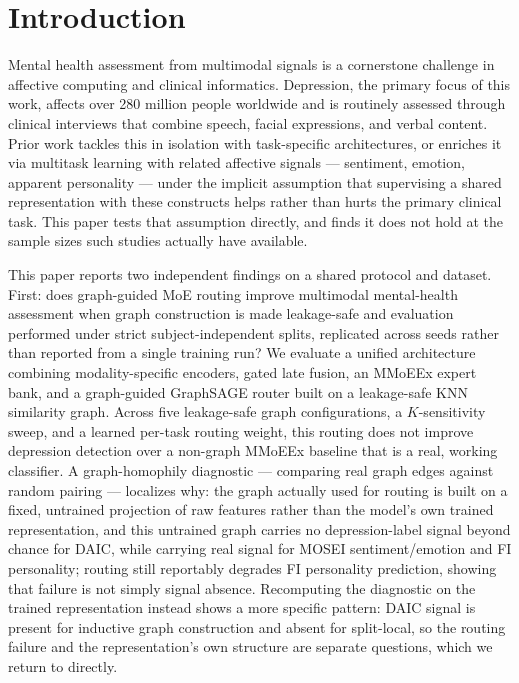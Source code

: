 \documentclass[twocolumn]{article}
\begin{document}
\begin{abstract}
is single-seed only, was never extended to this paper's 5-seed protocol, and is reported separately, under an explicit no-claims banner, precisely because a paper whose central finding is that single-seed results can mislead cannot also lean on six single-seed encoder comparisons as evidence. We release the leakage-safe graph construction protocol, the full multi-seed ablation ladder, and a claim-verification harness that binds every quantitative statement in this paper to a machine-checked artifact.
\end{abstract}

\section{Introduction}
\label{sec:introduction}

Mental health assessment from multimodal signals is a cornerstone challenge in affective computing and clinical informatics. Depression, the primary focus of this work, affects over 280 million people worldwide \citep{who2023depression} and is routinely assessed through clinical interviews that combine speech, facial expressions, and verbal content. Prior work tackles this in isolation with task-specific architectures, or enriches it via multitask learning with related affective signals — sentiment, emotion, apparent personality \citep{kendall2018multitask} — under the implicit assumption that supervising a shared representation with these constructs helps rather than hurts the primary clinical task. This paper tests that assumption directly, and finds it does not hold at the sample sizes such studies actually have available.

This paper reports two independent findings on a shared protocol and dataset. First: does graph-guided MoE routing improve multimodal mental-health assessment when graph construction is made leakage-safe and evaluation performed under strict subject-independent splits, replicated across seeds rather than reported from a single training run? We evaluate a unified architecture combining modality-specific encoders, gated late fusion, an MMoEEx expert bank, and a graph-guided GraphSAGE router built on a leakage-safe KNN similarity graph. Across five leakage-safe graph configurations, a $K$-sensitivity sweep, and a learned per-task routing weight, this routing does not improve depression detection over a non-graph MMoEEx baseline that is a real, working classifier. A graph-homophily diagnostic — comparing real graph edges against random pairing — localizes why: the graph actually used for routing is built on a fixed, untrained projection of raw features rather than the model's own trained representation, and this untrained graph carries no depression-label signal beyond chance for DAIC, while carrying real signal for MOSEI sentiment/emotion and FI personality; routing still reportably degrades FI personality prediction, showing that failure is not simply signal absence. Recomputing the diagnostic on the trained representation instead shows a more specific pattern: DAIC signal is present for inductive graph construction and absent for split-local, so the routing failure and the representation's own structure are separate questions, which we return to directly.
\end{document}
